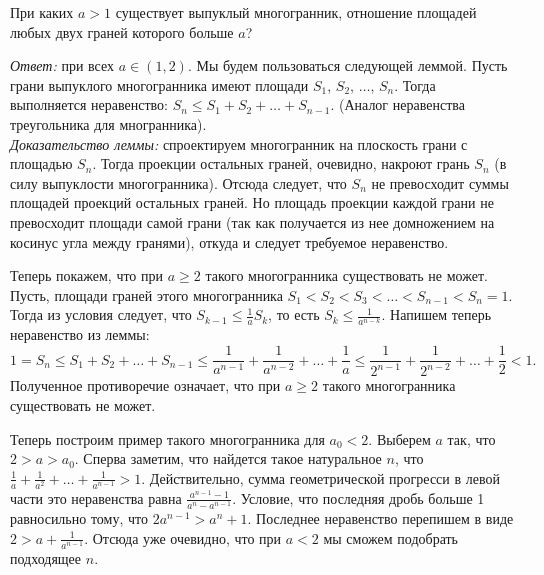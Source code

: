 \problem
При каких $a > 1$ существует выпуклый многогранник, отношение площадей любых
двух граней которого больше $a$?

\solution
\emph{Ответ:} при всех $a \in (1, 2)$.
Мы будем пользоваться следующей леммой. 
Пусть грани выпуклого
многогранника имеют площади $S_1$, $S_2$, $\ldots$, $S_n$.
Тогда выполняется неравенство: $S_n \leq S_1 + S_2 + \ldots + S_{n-1}$.
(Аналог неравенства треугольника для многранника).
\\\emph{Доказательство леммы:}
спроектируем многогранник на плоскость грани с площадью $S_n$.
Тогда проекции остальных граней, очевидно, накроют грань $S_n$ (в силу выпуклости многогранника).
Отсюда следует, что $S_n$ не превосходит суммы площадей проекций остальных граней.
Но площадь проекции каждой грани не превосходит площади самой грани
(так как получается из нее домножением на косинус угла между гранями),
откуда и следует требуемое неравенство.

Теперь покажем, что при $a \geq 2$ такого многогранника существовать не может.
Пусть, площади граней этого многогранника
$S_1 < S_2 < S_3 < \ldots < S_{n-1} < S_n = 1$.
Тогда из условия следует, что $S_{k-1} \leq \frac{1}{a} S_k$, то есть $S_k \leq \frac{1}{a^{n-k}}$.
Напишем теперь неравенство из леммы:
\[
    1
=
    S_n \leq S_1 + S_2 + \ldots + S_{n-1}
\leq
    \frac{1}{a^{n-1}} + \frac{1}{a^{n-2}}
    + \ldots +
    \frac{1}{a}
\leq
    \frac{1}{2^{n-1}} + \frac{1}{2^{n-2}}
    + \ldots +
    \frac{1}{2}
<
    1
.\]
Полученное противоречие означает, что при $a \geq 2$ такого
многогранника существовать не может.

Теперь построим пример такого многогранника для $a_0<2$.
Выберем $a$ так, что $2>a>a_0$.
Сперва заметим, что найдется такое натуральное $n$,
что $\frac{1}{a}+\frac{1}{a^2}+\ldots+\frac{1}{a^{n-1}}>1$.
Действительно, сумма геометрической прогресси в левой
части это неравенства равна $\frac{a^{n-1}-1}{a^n-a^{n-1}}$.
Условие, что последняя дробь больше 1 равносильно тому,
что $2a^{n-1}>a^n+1$. Последнее неравенство перепишем
в виде $2>a+\frac{1}{a^{n-1}}$. Отсюда уже очевидно,
что при $a<2$ мы сможем подобрать подходящее $n$.

